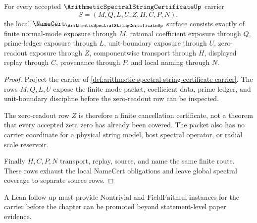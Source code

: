 \begin{theorem}
\label{thm:arithmetic-spectral-string-certificate-namecert-obligations}
For every accepted $\ArithmeticSpectralStringCertificateUp$ carrier
$$
S=(M,Q,L,U,Z,H,C,P,N),
$$
the local $\NameCert_{\ArithmeticSpectralStringCertificateUp}$ surface consists exactly of finite normal-mode exposure through $M$, rational coefficient exposure through $Q$, prime-ledger exposure through $L$, unit-boundary exposure through $U$, zero-readout exposure through $Z$, componentwise transport through $H$, displayed replay through $C$, provenance through $P$, and local naming through $N$.
\end{theorem}
\begin{proof}
Project the carrier of \autoref{def:arithmetic-spectral-string-certificate-carrier}. The rows $M,Q,L,U$ expose the finite mode packet, coefficient data, prime ledger, and unit-boundary discipline before the zero-readout row can be inspected.

The zero-readout row $Z$ is therefore a finite cancellation certificate, not a theorem that every accepted zeta zero has already been covered. The packet also has no carrier coordinate for a physical string model, host spectral operator, or radial scale reservoir.

Finally $H,C,P,N$ transport, replay, source, and name the same finite route. These rows exhaust the local NameCert obligations and leave global spectral coverage to separate source rows.
\end{proof}



A Lean follow-up must provide $\mathrm{Nontrivial}$ and $\mathrm{FieldFaithful}$ instances for the carrier before the chapter can be promoted beyond statement-level paper evidence.

